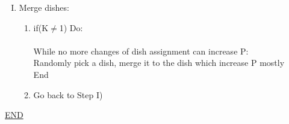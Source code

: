 \documentclass{article}
\begin{document}
\begin{spacing}{1.1}
\begin{enumerate}[(I)]
\item Merge dishes:\\
\begin{enumerate}[(1)]
\item if(K$\neq$1) Do: \\ \\
 While no more changes of dish assignment can increase P:\\
 Randomly pick a dish, merge it to the dish which increase P mostly\\
 End\\
\item Go back to Step I)
\end{enumerate}  


\end{enumerate}  

\underline{END}
\end{spacing}
\end{document}
